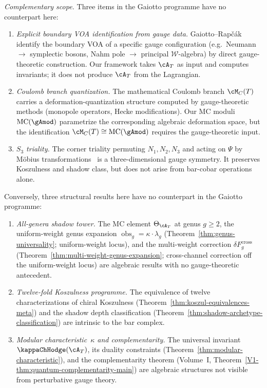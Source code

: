 \begin{remark}
\emph{Complementary scope.}
Three items in the Gaiotto programme have no counterpart here:
\begin{enumerate}[label=\textup{(\alph*)}]
\item \emph{Explicit boundary VOA identification from gauge data.}
 Gaiotto--Rap\v{c}\'ak~\cite{gaiotto-rapchak} identify the
 boundary VOA of a specific gauge configuration (e.g.\
 Neumann $\to$ symplectic bosons,
 Nahm pole $\to$ principal $\mathcal{W}$-algebra) by
 direct gauge-theoretic construction. Our framework takes
 $\cA_T$ as input and computes invariants; it does not
 produce $\cA_T$ from the Lagrangian.

\item \emph{Coulomb branch quantization.}
 The mathematical Coulomb branch
 $\cM_C(T)$~\cite{BFN18} carries a
 deformation-quantization structure computed by gauge-theoretic
 methods (monopole operators, Hecke modifications). Our MC
 moduli $\operatorname{MC}(\gAmod)$ parametrize the
 corresponding algebraic deformation space, but the
 identification $\cM_C(T) \cong \operatorname{MC}(\gAmod)$
 requires the gauge-theoretic input.

\item \emph{$S_3$ triality.}
 The corner triality permuting $N_1, N_2, N_3$ and acting on
 $\Psi$ by M\"obius
 transformations~\cite{gaiotto-rapchak}
 is a three-dimensional gauge symmetry. It preserves
 Koszulness and shadow class, but does not arise from bar-cobar
 operations alone.
\end{enumerate}
Conversely, three structural results here have no counterpart
in the Gaiotto programme:
\begin{enumerate}[label=\textup{(\alph*)}]
\item \emph{All-genera shadow tower.}
 The MC element $\Theta_{\cA_T}$ at genus $g \geq 2$,
 the uniform-weight genus expansion
 $\operatorname{obs}_g = \kappa \cdot \lambda_g$
 (Theorem~\ref{thm:genus-universality};
 uniform-weight locus),
 and the multi-weight correction $\delta F_g^{\mathrm{cross}}$
 (Theorem~\ref{thm:multi-weight-genus-expansion};
 cross-channel correction off the uniform-weight locus) are
 algebraic results with no gauge-theoretic antecedent.

\item \emph{Twelve-fold Koszulness programme.}
 The equivalence of twelve characterizations of chiral
 Koszulness
 (Theorem~\ref{thm:koszul-equivalences-meta}) and the
 shadow depth classification
 (Theorem~\ref{thm:shadow-archetype-classification}) are
 intrinsic to the bar complex.

\item \emph{Modular characteristic~$\kappa$ and complementarity.}
 The universal invariant~$\kappaChHodge(\cA_T)$, its duality
 constraints (Theorem~\ref{thm:modular-characteristic}),
 and the complementarity theorem
 (Volume~I, Theorem~\ref{V1-thm:quantum-complementarity-main}) are
 algebraic structures not visible from perturbative gauge
 theory.
\end{enumerate}
\end{remark}

